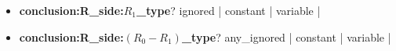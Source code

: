 \documentclass[onecolumn]{ctexart}
\begin{document}
\begin{itemize}
\begin{itemize}
        \item  \textbf{conclusion:R\_side:$R_1$\_type}? \qquad \qquad \qquad \quad
            {\color{blue}      ignored}   |
            {\color{LimeGreen} constant}  |
            {\color{LimeGreen} variable}  |

        \item  \textbf{conclusion:R\_side:$(R_0 - R_1)$\_type}? \qquad
            {\color{blue}      any\_ignored}   |
            {\color{Teal}      constant}  |
            {\color{LimeGreen} variable}  |


    \end{itemize}
\end{itemize}
\end{document}
